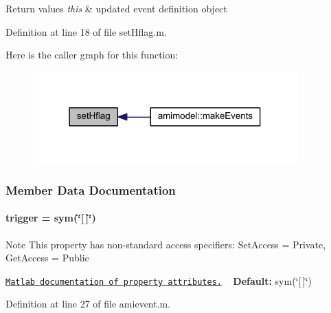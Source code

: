 \begin{DoxyRetVals}{Return values}
{\em this} & updated event definition object \\
\hline
\end{DoxyRetVals}


Definition at line 18 of file set\+Hflag.\+m.



Here is the caller graph for this function\+:\nopagebreak
\begin{figure}[H]
\begin{center}
\leavevmode
\includegraphics[width=289pt]{classamievent_aef1933f186f69e58e2aa1b00d01f75e7_icgraph}
\end{center}
\end{figure}




\subsubsection{Member Data Documentation}
\hypertarget{classamievent_ae194cb817eae4085f8023885100c68dd}{}
\paragraph[{trigger}]{\setlength{\rightskip}{0pt plus 5cm}trigger = sym(\char`\"{}\mbox{[}$\,$\mbox{]}\char`\"{})}\label{classamievent_ae194cb817eae4085f8023885100c68dd}
\begin{DoxyNote}{Note}
This property has non-\/standard access specifiers\+: {\ttfamily Set\+Access = Private, Get\+Access = Public} 

\href{http://www.mathworks.com/help/matlab/matlab_oop/property-attributes.html}{\tt Matlab documentation of property attributes.} ~\newline
{\bfseries Default\+:} sym(\char`\"{}\mbox{[}$\,$\mbox{]}\char`\"{}) 
\end{DoxyNote}


Definition at line 27 of file amievent.\+m.

\hypertarget{classamievent_ab9227561ac246ee4b70f9e65c25ffda7}{}
